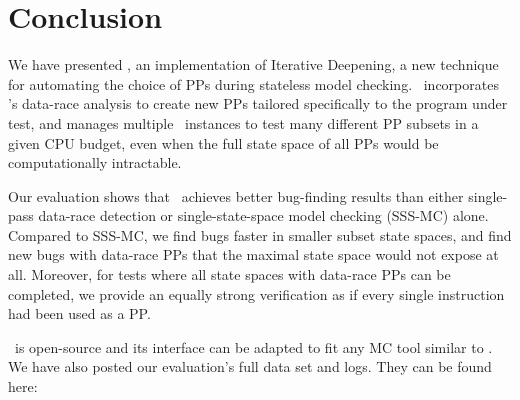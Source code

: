 \documentclass[pldi]{sigplanconf-pldi15}
\begin{document}







\section{Conclusion}
\label{sec:conclusion}


We have presented \quicksand, an implementation of Iterative Deepening, a new technique for automating the choice of PPs during stateless model checking.
\quicksand~incorporates \landslide's data-race analysis to create new PPs tailored specifically to the program under test,
and manages multiple \landslide~instances to test many different PP subsets in a given CPU budget, even when the full state space of all PPs would be computationally intractable.

Our evaluation shows that \quicksand~achieves better bug-finding results than either single-pass data-race detection or single-state-space model checking (SSS-MC) alone.
Compared to SSS-MC, we find bugs faster in smaller subset state spaces,
and find new bugs with data-race PPs that the maximal state space would not expose at all.
Moreover, for tests where all state spaces with data-race PPs can be completed, we provide an equally strong verification as if every single instruction had been used as a PP.

\quicksand~is open-source and its interface can be adapted to fit any MC tool similar to \landslide.
We have also posted our evaluation's full data set and logs.
They can be found here:
\end{document}
